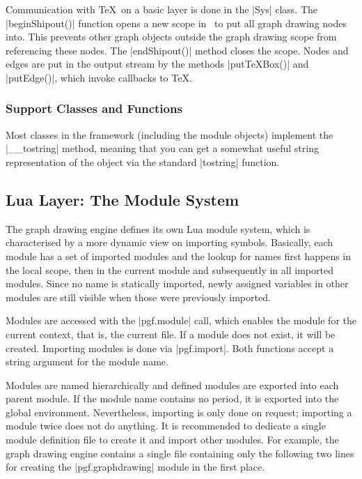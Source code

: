 %

Communication with \TeX\ on a basic layer is done in the |Sys|
class. The |beginShipout()| function opens a new scope in \pgfname\
to put all graph drawing nodes into. This prevents other graph objects
outside the graph drawing scope from referencing these nodes. The
|endShipout()| method closes the scope. Nodes and edges are put in the
output stream by the methods |putTeXBox()| and |putEdge()|, which
invoke callbacks to \TeX. 


\subsubsection{Support Classes and Functions}

Most classes in the framework (including the module objects) implement
the |__tostring| method, meaning that you can get a somewhat useful
string representation of the object via the standard |tostring|
function.

%
%
%




\subsection{Lua Layer: The Module System}
  
The graph drawing engine defines its own Lua module system, which is
characterised by a more dynamic view on importing symbols.  Basically,
each module has a set of imported modules and the lookup for names
first happens in the local scope, then in the current module and
subsequently in all imported modules.  Since no name is statically
imported, newly assigned variables in other modules are still visible
when those were previously imported.

Modules are accessed with the |pgf.module| call, which enables the
module for the current context, that is, the current file. If a module
does not exist, it will be created.  Importing modules is done via
|pgf.import|.  Both functions accept a string argument for the
module name.

Modules are named hierarchically and defined modules are exported into
each parent module.  If the module name contains no period, it is
exported into the global environment.  Nevertheless, importing is only
done on request; importing a module twice does not do anything.
It is recommended to dedicate a single module definition file
to create it and import other modules.  For example, the graph drawing
engine contains a single file containing only the following two lines for
creating the |pgf.graphdrawing| module in the first place.

